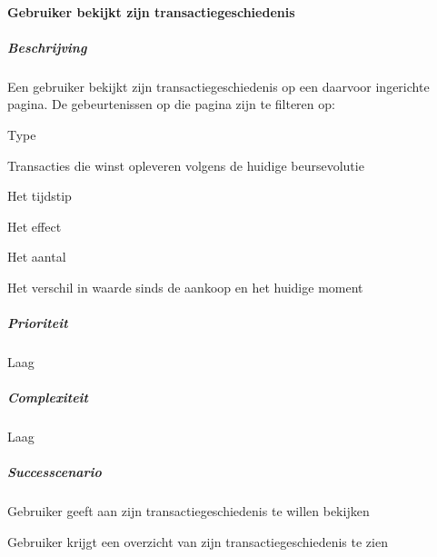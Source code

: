 \paragraph{Gebruiker bekijkt zijn transactiegeschiedenis}
\begin{compact}
\subparagraph{Beschrijving} Een gebruiker bekijkt zijn transactiegeschiedenis op een daarvoor ingerichte pagina. De gebeurtenissen op die pagina zijn te filteren op:
\begin{itemize_compact}
	\item Type
	\item Transacties die winst opleveren volgens de huidige beursevolutie
	\item Het tijdstip
	\item Het effect
	\item Het aantal
	\item Het verschil in waarde sinds de aankoop en het huidige moment
\end{itemize_compact}
\subparagraph{Prioriteit}Laag
\subparagraph{Complexiteit}Laag
\subparagraph{Successcenario}
\begin{enumerate_compact}
 \item Gebruiker geeft aan zijn transactiegeschiedenis te willen bekijken
 \item Gebruiker krijgt een overzicht van zijn transactiegeschiedenis te zien
\end{enumerate_compact}
\end{compact}


